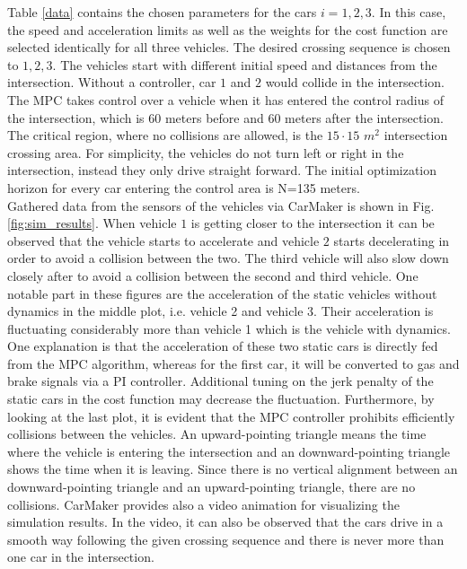 \documentclass[letterpaper,10pt,conference]{ieeeconf}
\begin{document}
Table \ref{data} contains the chosen parameters for the cars $i=1,2,3$. In this case, the speed and acceleration limits as well as the weights for the cost function are selected identically for all three vehicles. The desired crossing sequence is chosen to $1,2,3$. The vehicles start with different initial speed and distances from the intersection. Without a controller, car $1$ and $2$ would collide in the intersection. The MPC takes control over a vehicle when it has entered the control radius of the intersection, which is $60$ meters before and $60$ meters after the intersection. The critical region, where no collisions are allowed, is the $15\cdot15$ $m^2$ intersection crossing area. For simplicity, the vehicles do not turn left or right in the intersection, instead they only drive straight forward. The initial optimization horizon for every car entering the control area is N=135 meters.\\ \indent
Gathered data from the sensors of the vehicles via CarMaker is shown in Fig. \ref{fig:sim_results}. When vehicle $1$ is getting closer to the intersection it can be observed that the vehicle starts to accelerate and vehicle $2$ starts decelerating in order to avoid a collision between the two. The third vehicle will also slow down closely after to avoid a collision between the second and third vehicle. One notable part in these figures are the acceleration of the static vehicles without dynamics in the middle plot, i.e. vehicle 2 and vehicle 3. Their acceleration is fluctuating considerably more than vehicle 1 which is the vehicle with dynamics. One explanation is that the acceleration of these two static cars is directly fed from the MPC algorithm, whereas for the first car, it will be converted to gas and brake signals via a PI controller. Additional tuning on the jerk penalty of the static cars in the cost function may decrease the fluctuation. Furthermore, by looking at the last plot, it is evident that the MPC controller prohibits efficiently collisions  between the vehicles. An upward-pointing triangle means the time where the vehicle is entering the intersection and an downward-pointing triangle shows the time when it is leaving. Since there is no vertical alignment between an downward-pointing triangle and an upward-pointing triangle, there are no collisions. CarMaker provides also a video animation for visualizing the simulation results. In the video, it can also be observed that the cars drive in a smooth way following the given crossing sequence and there is never more than one car in the intersection.
\end{document}
